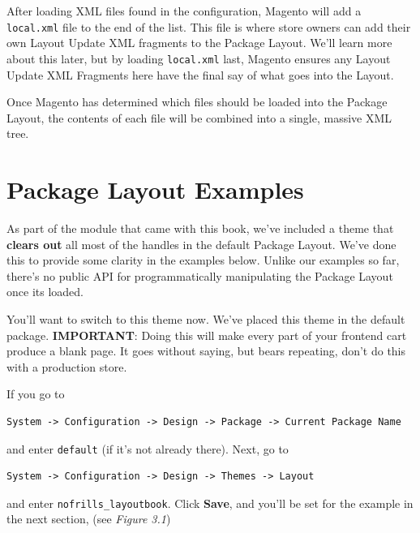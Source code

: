 \documentclass[oneside]{book}
\begin{document}
After loading XML files found in the configuration, Magento will add a \footnotesize\texttt{local.xml} \normalsize  file to the end of the list.  This file is where store owners can add their own Layout Update XML fragments to the Package Layout. We'll learn more about this later, but by loading \footnotesize\texttt{local.xml} \normalsize  last, Magento ensures any Layout Update XML Fragments here have the final say of what goes into the Layout.

Once Magento has determined which files should be loaded into the Package Layout, the contents of each file will be combined into a single, massive XML tree.

\section{Package Layout Examples}

As part of the module that came with this book, we've included a theme that \textbf{clears out} all most of the handles in the default Package Layout.  We've done this to provide some clarity in the examples below.  Unlike our examples so far, there's no public API for programmatically manipulating the Package Layout once its loaded.

You'll want to switch to this theme now.  We've placed this theme in the default package.  \textbf{IMPORTANT}: Doing this will make every part of your frontend cart produce a blank page.  It goes without saying, but bears repeating, don't do this with a production store.

If you go to

\begin{lstlisting}
System -> Configuration -> Design -> Package -> Current Package Name

\end{lstlisting}


and enter \footnotesize\texttt{default} \normalsize  (if it's not already there).  Next, go to

\begin{lstlisting}
System -> Configuration -> Design -> Themes -> Layout

\end{lstlisting}


and enter \footnotesize\texttt{nofrills\_layoutbook}\normalsize. Click \textbf{Save}, and you'll be set for the example in the next section, (see \emph{Figure 3.1})
\end{document}
